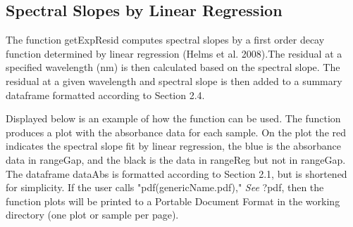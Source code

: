 \documentclass[a4paper,11pt]{article}\usepackage[]{graphicx}\usepackage[]{color}
\begin{document}
\subsection{Spectral Slopes by Linear Regression}
The function getExpResid computes spectral slopes by a first order decay function determined by linear regression (Helms et al. 2008).The residual at a specified wavelength (nm) is then calculated based on the spectral slope. The residual at a given wavelength and spectral slope is then added to a summary dataframe formatted according to Section 2.4. 

Displayed below is an example of how the function can be used. The function produces a plot with the absorbance data for each sample. On the plot the red indicates the spectral slope fit by linear regression, the blue is the absorbance data in rangeGap, and the black is the data in rangeReg but not in rangeGap. The dataframe dataAbs is formatted according to Section 2.1, but is shortened for simplicity. If the user calls "pdf(genericName.pdf)," \emph{See }?pdf, then the function plots will be printed to a Portable Document Format in the working directory (one plot or sample per page). 
\end{document}
